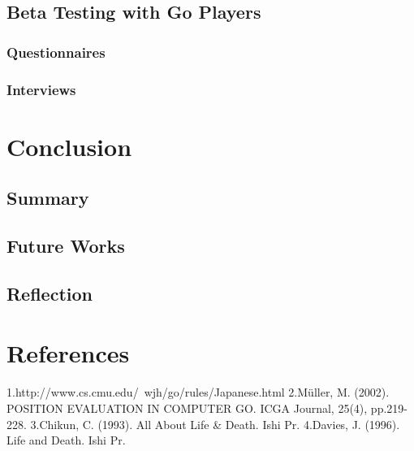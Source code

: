 \documentclass{l4proj}
\begin{document}
\section{Beta Testing with Go Players}
\subsection{Questionnaires}
\subsection{Interviews}






\chapter{Conclusion}

\section{Summary}

\section{Future Works}

\section{Reflection}


\chapter{References}
1.http://www.cs.cmu.edu/~wjh/go/rules/Japanese.html
2.Müller, M. (2002). POSITION EVALUATION IN COMPUTER GO. ICGA Journal, 25(4), pp.219-228.
3.Chikun, C. (1993). All About Life & Death. Ishi Pr.
4.Davies, J. (1996). Life and Death. Ishi Pr.
\end{document}
